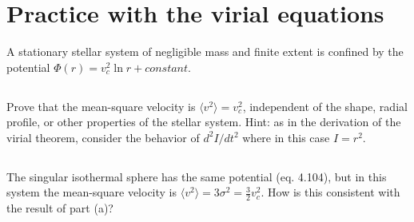 \section{Practice with the virial equations}

A stationary stellar system of negligible mass and finite extent is confined by the
potential  $\Phi(r)=v_c^2\ln{r}+constant$.

\subsection{}
Prove that the mean-square velocity is $\langle v^2 \rangle = v_c^2$, independent of the shape, radial
profile, or other properties of the stellar system. Hint: as in the derivation of the virial
theorem, consider the behavior of $d^2I/dt^2$ where in this case $I=r^2$.

\subsection{}
The singular isothermal sphere has the same potential (eq. 4.104), but in this system
the mean-square velocity is $\langle v^2\rangle = 3\sigma^2 = \frac{3}{2}v_c^2$. How is this consistent with the result of
part (a)?
